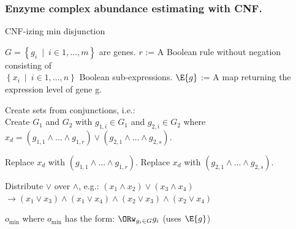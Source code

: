 \documentclass[compress,red,notes]{beamer}
\begin{document}
\begin{frame}[fragile]
\frametitle{Enzyme complex abundance estimating with CNF.}

\begin{algorithm}[H]
\scriptsize
\caption{CNF-izing min disjunction}
\label{alg:ReductionToCNF}
\begin{algorithmic}
\INPUT $G = \left\{g_i~\mid~i \in{1, \ldots, m}\right\}$ are genes. 
\INPUT $r$ := A Boolean rule without negation consisting of\\
  $\left\{x_i~\mid~i \in{1, \ldots, n}\right\}$ Boolean sub-expressions.
\INPUT $\E{g}$ := A map returning the expression level of gene g.
  \State \parbox[t]{\dimexpr\linewidth-\algorithmicindent}{
    Create sets from conjunctions, i.e.:\\
    Create $G_1$ and $G_2$ with $g_{1,i} \in G_1$ 
    and $g_{2,i} \in G_2$ where\\ 
    $x_d = (g_{1,1} \land \ldots \land g_{1,r}) \lor 
    (g_{2,1} \land \ldots \land g_{2,s})$. 
    \strut}
    \State Replace $x_d$ with $(g_{1,1} \land \ldots \land g_{1,r})$.
    \State Replace $x_d$ with $(g_{2,1} \land \ldots \land g_{2,s})$.
    \EndIf 
  \EndIf
  \State \parbox[t]{\dimexpr\linewidth-\algorithmicindent}{
    Distribute $\lor$ over $\land$, e.g.: $(x_1 \land x_2) \lor (x_3 \land x_4)$ \\ 
    $\rightarrow (x_1 \lor x_3) \land (x_1 \lor x_4) \land 
    (x_2 \lor x_3) \land (x_2 \lor x_4)$
    \strut}
\EndWhile
\OUTPUT $o_{\min}$ where $o_{\min}$ has the form: $\ORw_{g_i \in G} g_i$ (uses $\E{g}$)
\end{algorithmic} 
\end{algorithm}

\end{frame}

\end{document}
